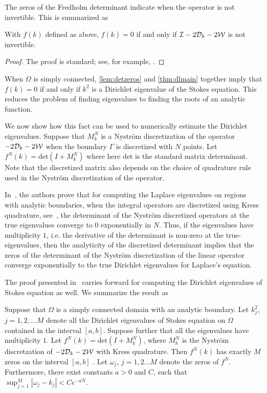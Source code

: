 The zeros of the Fredholm determinant indicate when the
operator is not invertible. 
This is summarized as 
\begin{lem} \label{lem:detzeros}
  With $f(k)$ defined as above, $f(k) = 0$ if and only if
  $\mathcal I - 2{\mathcal D}_{k} -2{\mathcal W}$ is not invertible.
\end{lem}
\begin{proof}
  The proof is standard; see, for example,
  \cite[p. 34]{simon2005trace}.
\end{proof}

When $\Omega$ is simply connected, \cref{lem:detzeros} and 
\cref{thm:dlmain} together imply that $f(k) = 0$
if and only if $k^2$ 
is a Dirichlet eigenvalue of the Stokes equation.
This reduces the problem of finding eigenvalues to
finding the roots of an analytic function.

We now show how this fact can be used to numerically
estimate the Dirichlet eigenvalues.
Suppose that $M_{k}^{N}$ is a Nystr\"{o}m discretization 
of the operator $-2{\mathcal D}_{k} - 2{\mathcal W}$ when the boundary 
$\Gamma$ is discretized with $N$ points. 
Let $f^{N}(k) = \text{det}(I + M_{k}^{N})$
where here $\text{det}$ is the standard matrix determinant.
Note that the discretized matrix also depends on the choice
of quadrature rule used in the Nystr\"{o}m discretization
of the operator.

In~\cite{zhao2015robust}, the authors prove that
for computing the Laplace eigenvalues on regions with 
analytic boundaries, when the integral operators are
discretized using Kress quadrature, see~\cite{kress1991boundary},
the determinant of the Nystr\"{o}m discretized operators
at the true eigenvalues converge to $0$ exponentially
in $N$.
Thus, if the eigenvalues have multiplicity $1$,
i.e. the derivative of the determinant is non-zero
at the true-eigenvalues, then the analyticity of the
discretized determinant implies that the zeros
of the determinant of the Nystr\"{o}m discretization
of the linear operator converge exponentially to
the true Dirichlet eigenvalues for Laplace's equation.

The proof presented in~\cite{zhao2015robust} carries
forward for computing the Dirichlet eigenvalues of
Stokes equation as well.
We summarize the result as
\begin{thrm}
\label{thm:mainconvfreddet}
Suppose that $\Omega$ is a simply connected
domain with an analytic boundary. Let $k_{j}^2$, $j=1,2,\ldots M$
denote all the Dirichlet eigenvalues of Stokes equation
on $\Omega$ contained in the interval $[a,b]$. 
Suppose further that all the eigenvalues have multiplicity $1$.
Let $f^{N}(k) = \text{det}(I+M^{N}_{k})$, where $M^{N}_{k}$ 
is the Nystr\"{o}m discretzation of $-2{\mathcal D}_{k} - 2{\mathcal W}$ with Kress
quadrature.
Then $f^{N}(k)$ has exactly $M$ zeros on the interval $[a,b]$
. 
Let $\omega_{j}$, $j=1,2\ldots M$ denote the zeros of $f^{N}$.
Furthermore, there exist constants $a>0$ and $C$, 
such that $\sup_{j=1}^{M} |\omega_{j} - k_{j}| < C e^{-aN}$.
\end{thrm}

